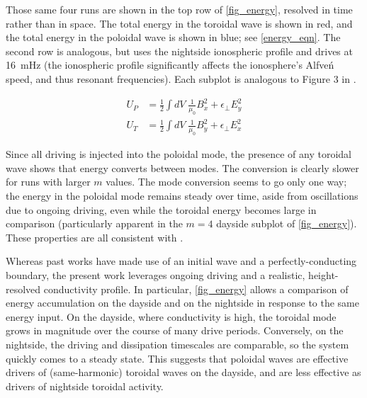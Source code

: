 \documentclass[draft,linenumbers]{agujournal}
\begin{document}
Those same four runs are shown in the top row of \cref{fig_energy}, resolved in time rather than in space. The total energy in the toroidal wave is shown in red, and the total energy in the poloidal wave is shown in blue; see \cref{energy_eqn}. The second row is analogous, but uses the nightside ionospheric profile and drives at \SI{16}{\mHz} (the ionospheric profile significantly affects the ionosphere's Alfve\'n speed, and thus resonant frequencies). Each subplot is analogous to Figure 3 in \citet{mann_1995}.
\begin{linenomath*}
\begin{align}
  \label{energy_eqn}
    U_P &= \frac{1}{2} \displaystyle\int dV \; \frac{1}{\mu_0} B_x^2 + \epsilon_\bot E_y^2 \\
    U_T &= \frac{1}{2} \displaystyle\int dV \; \frac{1}{\mu_0} B_y^2 + \epsilon_\bot E_x^2
\end{align}
\end{linenomath*}

Since all driving is injected into the poloidal mode, the presence of any toroidal wave shows that energy converts between modes. The conversion is clearly slower for runs with larger $m$ values. The mode conversion seems to go only one way; the energy in the poloidal mode remains steady over time, aside from oscillations due to ongoing driving, even while the toroidal energy becomes large in comparison (particularly apparent in the $m = 4$ dayside subplot of \cref{fig_energy}). These properties are all consistent with \citet{mann_1995}.

Whereas past works have made use of an initial wave and a perfectly-conducting boundary, the present work leverages ongoing driving and a realistic, height-resolved conductivity profile. In particular, \cref{fig_energy} allows a comparison of energy accumulation on the dayside and on the nightside in response to the same energy input. On the dayside, where conductivity is high, the toroidal mode grows in magnitude over the course of many drive periods. Conversely, on the nightside, the driving and dissipation timescales are comparable, so the system quickly comes to a steady state. This suggests that poloidal waves are effective drivers of (same-harmonic) toroidal waves on the dayside, and are less effective as drivers of nightside toroidal activity.
\end{document}

